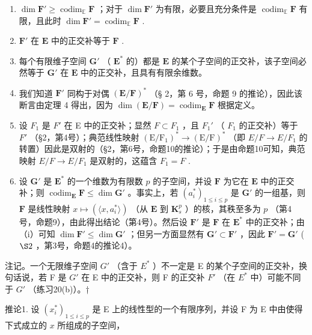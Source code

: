 \begin{enumerate}
\def\labelenumi{(\roman{enumi})}
\item
  \(\dim \mathbf{F}' \geqslant \operatorname{codim}_{\mathbb{E}} \mathbf{F}\) ；对于 \(\dim \mathbf{F}'\) 为有限，必要且充分条件是 \(\operatorname{codim}_{\mathbb{E}} \mathbf{F}\) 有限，且此时 \(\dim \mathbf{F}' = \operatorname{codim}_{\mathbb{E}} \mathbf{F}\) .
\item
  \(\mathbf{F}'\) 在 \(\mathbf{E}\) 中的正交补等于 \(\mathbf{F}\) .
\item
  每个有限维子空间 \(\mathbf{G}'\) （ \(\mathbf{E}^*\) 的）都是 \(\mathbf{E}\) 的某个子空间的正交补，该子空间必然等于 \(\mathbf{G}'\) 在 \(\mathbf{E}\) 中的正交补，且具有有限余维数。
\item
  我们知道 \(\mathbf{F}'\) 同构于对偶 \((\mathbf{E} / \mathbf{F})^*\) （§ 2，第 6 号，命题 9 的推论），因此该断言由定理 4 得出，因为 \(\dim (\mathbf{E} / \mathbf{F}) = \operatorname{codim}_{\mathbf{E}}\mathbf{F}\) 根据定义。
\item
  设 \(F_{1}\) 是 \(F'\) 在 E 中的正交补；显然 \(F \subset F_{1}\) ，且 \(F_{1}'\) （ \(F_{1}\) 的正交补）等于 \(F'\) （§2，第4号）；典范线性映射 \((\mathrm{E}/\mathrm{F}_{1})^{*} \to (\mathrm{E}/\mathrm{F})^{*}\) （即 \(E/F \to E/F_{1}\) 的转置）因此是双射的（§2，第6号，命题10的推论）；于是由命题10可知，典范映射 \(E/F \to E/F_{1}\) 是双射的，这蕴含 \(F_{1} = F\) .
\item
  设 \(\mathbf{G}'\) 是 \(\mathbf{E}^*\) 的一个维数为有限数 \(p\) 的子空间，并设 \(\mathbf{F}\) 为它在 \(\mathbf{E}\) 中的正交补；则 \(\operatorname{codim}_{\mathbf{E}} \mathbf{F} \leqslant \dim \mathbf{G}'\) 。事实上，若 \((a_{i}^{*})_{1 \leqslant i \leqslant p}\) 是 \(\mathbf{G}'\) 的一组基，则 \(\mathbf{F}\) 是线性映射 \(x \mapsto (\langle x, a_{i}^{*} \rangle)\) （从 \(\mathbf{E}\) 到 \(\mathbf{K}_{s}^{p}\) ）的核，其秩至多为 \(p\) （第4号，命题9），由此得出结论（第4号）。然后设 \(\mathbf{F}'\) 是 \(\mathbf{F}\) 在 \(\mathbf{E}^*\) 中的正交补；由（i）可知 \(\dim \mathbf{F}' \leqslant \dim \mathbf{G}'\) ；但另一方面显然有 \(\mathbf{G}' \subset \mathbf{F}'\) ，因此 \(\mathbf{F}' = \mathbf{G}'\) ( \(\S 2\) ，第3号，命题4的推论4）。
\end{enumerate}

注记。一个无限维子空间 \(G'\) （含于 \(E^{*}\) ）不一定是 E 的某个子空间的正交补，换句话说，若 F 是 \(G'\) 在 E 中的正交补，则 F 的正交补 \(F'\) （在 \(E^{*}\) 中）可能不同于 \(G'\) （练习20(b)）。†

推论1. 设 \((x_{i}^{*})_{1\leqslant i\leqslant p}\) 是 E 上的线性型的一个有限序列，并设 F 为 E 中由使得下式成立的 \(x\) 所组成的子空间，

